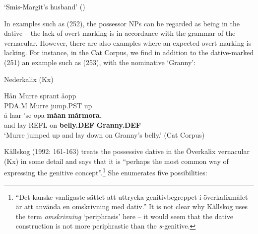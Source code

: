 \glt ‘Smis-Margit’s husband’ (\citet[97]{Levander1909})

\z

In examples such as (252), the possessor NPs can be regarded as being in the dative – the lack of overt marking is in accordance with the grammar of the vernacular. However, there are also examples where an expected overt marking is lacking. For instance, in the Cat Corpus, we find in addition to the dative-marked (251) an example such as (253), with the nominative  ‘Granny’: 


\item 

\label{bkm:Ref110681866}Nederkalix (Kx)



 \ea\label{}
\gll Hån  Murre  sprant  åopp\\


PDA.M  Murre  jump.PST  up\\

 \ea\label{}
\gll å  laar  ’se  opa  \textbf{måan}\textbf{  mårmora.}\\


and  lay  REFL  on  \textbf{belly.DEF} \textbf{Granny.DEF}\\

\glt ‘Murre jumped up and lay down on Granny’s belly.’ (Cat Corpus)

\z

Källskog (1992: 161-163) treats the possessive dative in the Överkalix vernacular (Kx) in some detail and says that it is “perhaps the most common way of expressing the genitive concept”.\footnote{ “Det kanske vanligaste sättet att uttrycka genitivbegreppet i överkalixmålet är att använda en omskrivning med dativ.” It is not clear why Källskog uses the term \textit{omskrivning} ‘periphrasis’ here – it would seem that the dative construction is not more periphrastic than the \textit{s-}genitive.} She enumerates five possibilities:

